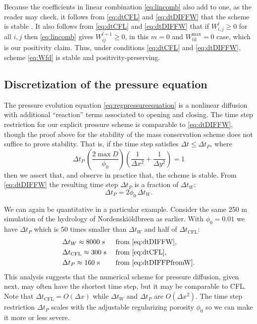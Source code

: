 \documentclass[gmd]{copernicus}   %
\newcommand{\text}{\textrm}
\newcommand{\Wtilmax}{W_{\text{til}}^{\text{max}}}
\newcommand{\Wlij}{W^l_{i,j}}
\newcommand{\Nbreen}{Nordenski\"oldbreen\xspace}
\begin{document}
Because the coefficients in linear combination \eqref{eq:lincomb} also add to one, as the reader may check, it follows  from \eqref{eq:dtCFL} and \eqref{eq:dtDIFFW} that the scheme is stable \citep{MortonMayers}.  It also follows from \eqref{eq:dtCFL} and \eqref{eq:dtDIFFW} that if $\Wlij\ge 0$ for all $i,j$ then \eqref{eq:lincomb} gives $W_{ij}^{l+1}\ge 0$, in this $m=0$ and $\Wtilmax=0$ case, which is our positivity claim.  Thus, under conditions \eqref{eq:dtCFL} and \eqref{eq:dtDIFFW}, scheme \eqref{eq:Wfd} is stable and positivity-preserving.

\subsection{Discretization of the pressure equation}  The pressure evolution equation \eqref{eq:regpressureequation} is a nonlinear diffusion with additional ``reaction'' terms associated to opening and closing.  The time step restriction for our explicit pressure scheme is comparable to \eqref{eq:dtDIFFW}, though the proof above for the stability of the mass conservation scheme does not suffice to prove stability.  That is, if the time step satisfies $\Delta t \le \Delta t_P$, where
\begin{equation}
\Delta t_P\, \left(\frac{2 \max D}{\phi_0}\right) \left(\frac{1}{\Delta x^2} + \frac{1}{\Delta y^2}\right) = 1 \label{eq:dtDIFFP}
\end{equation}
then we assert that, and observe in practice that, the scheme is stable.  From \eqref{eq:dtDIFFW} the resulting time step $\Delta t_P$ is a fraction of $\Delta t_W$:
\begin{equation}
\Delta t_P = 2 \phi_0\, \Delta t_W.  \label{eq:dtDIFFPfromW}
\end{equation}

We can again be quantitative in a particular example.  Consider the same 250 m simulation of the hydrology of \Nbreen as earlier.  With $\phi_0 = 0.01$ we have $\Delta t_P$ which is 50 times smaller than $\Delta t_W$ and half of $\Delta t_{\text{CFL}}$:
\begin{align*}
  &\Delta t_W            \approx 8000 \text{ s} &&\text{ from \eqref{eq:dtDIFFW}}, \\
  &\Delta t_{\text{CFL}} \approx 300  \text{ s} &&\text{ from \eqref{eq:dtCFL}}, \\
  &\Delta t_P            \approx 160  \text{ s} &&\text{ from \eqref{eq:dtDIFFPfromW}.}
\end{align*}
This analysis suggests that the numerical scheme for pressure diffusion, given next, may often have the shortest time step, but it may be comparable to CFL.  Note that $\Delta t_{\text{CFL}}=O(\Delta x)$ while $\Delta t_W$ and $\Delta t_P$ are $O(\Delta x^2)$.  The time step restriction $\Delta t_P$ scales with the adjustable regularizing porosity $\phi_0$ so we can make it more or less severe.
\end{document}
